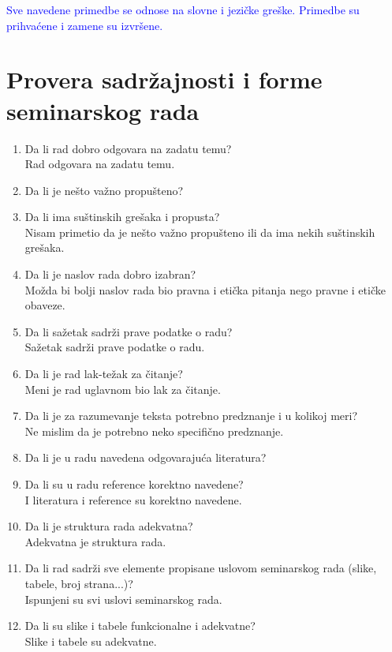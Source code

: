 \documentclass[a4paper]{report}
\newcommand{\odgovor}[1]{\textcolor{blue}{#1}}
\begin{document}
\odgovor{Sve navedene primedbe se odnose na slovne i jezičke greške. Primedbe su prihvaćene i zamene su izvršene.}

\section{Provera sadržajnosti i forme seminarskog rada}

\begin{enumerate}
\item Da li rad dobro odgovara na zadatu temu?\\
Rad odgovara na zadatu temu.
\item Da li je nešto važno propušteno?
\item Da li ima suštinskih grešaka i propusta?\\
Nisam primetio da je nešto važno propušteno ili da ima nekih suštinskih grešaka.
\item Da li je naslov rada dobro izabran?\\
Možda bi bolji naslov rada bio pravna i etička pitanja nego pravne i etičke obaveze.
\item Da li sažetak sadrži prave podatke o radu?\\
Sažetak sadrži prave podatke o radu.
\item Da li je rad lak-težak za čitanje?\\
Meni je rad uglavnom bio lak za čitanje.
\item Da li je za razumevanje teksta potrebno predznanje i u kolikoj meri?\\
Ne mislim da je potrebno neko specifično predznanje.
\item Da li je u radu navedena odgovarajuća literatura?
\item Da li su u radu reference korektno navedene?\\
I literatura i reference su korektno navedene.
\item Da li je struktura rada adekvatna?\\
Adekvatna je struktura rada.
\item Da li rad sadrži sve elemente propisane uslovom seminarskog rada (slike, tabele, broj strana...)?\\
Ispunjeni su svi uslovi seminarskog rada.
\item Da li su slike i tabele funkcionalne i adekvatne?\\
Slike i tabele su adekvatne.
\end{enumerate}
\end{document}
